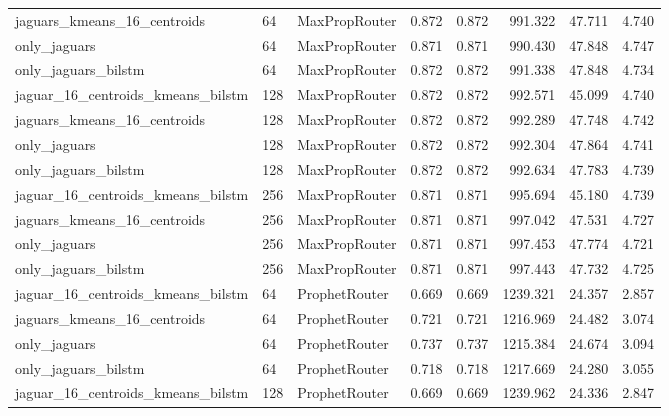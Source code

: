\begin{table}
\begin{tabular}{lllrrrrr}
\cline{1-8} \cline{2-8} \cline{3-8}
jaguars_kmeans_16_centroids & 64 & MaxPropRouter & 0.872 & 0.872 & 991.322 & 47.711 & 4.740 \\
\cline{1-8} \cline{2-8} \cline{3-8}
only_jaguars & 64 & MaxPropRouter & 0.871 & 0.871 & 990.430 & 47.848 & 4.747 \\
\cline{1-8} \cline{2-8} \cline{3-8}
only_jaguars_bilstm & 64 & MaxPropRouter & 0.872 & 0.872 & 991.338 & 47.848 & 4.734 \\
\cline{1-8} \cline{2-8} \cline{3-8}
jaguar_16_centroids_kmeans_bilstm & 128 & MaxPropRouter & 0.872 & 0.872 & 992.571 & 45.099 & 4.740 \\
\cline{1-8} \cline{2-8} \cline{3-8}
jaguars_kmeans_16_centroids & 128 & MaxPropRouter & 0.872 & 0.872 & 992.289 & 47.748 & 4.742 \\
\cline{1-8} \cline{2-8} \cline{3-8}
only_jaguars & 128 & MaxPropRouter & 0.872 & 0.872 & 992.304 & 47.864 & 4.741 \\
\cline{1-8} \cline{2-8} \cline{3-8}
only_jaguars_bilstm & 128 & MaxPropRouter & 0.872 & 0.872 & 992.634 & 47.783 & 4.739 \\
\cline{1-8} \cline{2-8} \cline{3-8}
jaguar_16_centroids_kmeans_bilstm & 256 & MaxPropRouter & 0.871 & 0.871 & 995.694 & 45.180 & 4.739 \\
\cline{1-8} \cline{2-8} \cline{3-8}
jaguars_kmeans_16_centroids & 256 & MaxPropRouter & 0.871 & 0.871 & 997.042 & 47.531 & 4.727 \\
\cline{1-8} \cline{2-8} \cline{3-8}
only_jaguars & 256 & MaxPropRouter & 0.871 & 0.871 & 997.453 & 47.774 & 4.721 \\
\cline{1-8} \cline{2-8} \cline{3-8}
only_jaguars_bilstm & 256 & MaxPropRouter & 0.871 & 0.871 & 997.443 & 47.732 & 4.725 \\
\cline{1-8} \cline{2-8} \cline{3-8}
jaguar_16_centroids_kmeans_bilstm & 64 & ProphetRouter & 0.669 & 0.669 & 1239.321 & 24.357 & 2.857 \\
\cline{1-8} \cline{2-8} \cline{3-8}
jaguars_kmeans_16_centroids & 64 & ProphetRouter & 0.721 & 0.721 & 1216.969 & 24.482 & 3.074 \\
\cline{1-8} \cline{2-8} \cline{3-8}
only_jaguars & 64 & ProphetRouter & 0.737 & 0.737 & 1215.384 & 24.674 & 3.094 \\
\cline{1-8} \cline{2-8} \cline{3-8}
only_jaguars_bilstm & 64 & ProphetRouter & 0.718 & 0.718 & 1217.669 & 24.280 & 3.055 \\
\cline{1-8} \cline{2-8} \cline{3-8}
jaguar_16_centroids_kmeans_bilstm & 128 & ProphetRouter & 0.669 & 0.669 & 1239.962 & 24.336 & 2.847 \\

\end{tabular}
\end{table}
